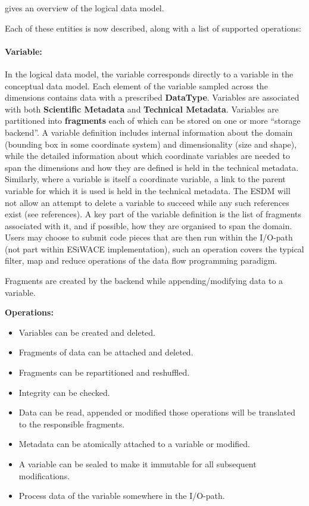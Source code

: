  gives an overview of the logical data model.



Each of these entities is now described, along with a list of supported operations:

\paragraph{Variable:} In the logical data model, the variable corresponds directly to a variable in the conceptual data model. Each element of the variable sampled across the dimensions contains data with a prescribed \textbf{DataType}.
Variables are associated with both \textbf{Scientific Metadata} and \textbf{Technical Metadata}. Variables are partitioned into \textbf{fragments} each of which can be stored on one or more ``storage backend''.
A variable definition includes internal information about the domain (bounding box in some coordinate system)  and dimensionality (size and shape), while the detailed information about which coordinate variables are needed to span the dimensions and how they are defined is held in the technical metadata.  Similarly, where a variable is itself a coordinate variable, a link to the parent variable for which it is used is held in the technical metadata.
The ESDM will not allow an attempt to delete a variable to succeed while any such references exist (see references).
A key part of the variable definition is the list of fragments associated with it, and if possible, how they are organised to span the domain.
Users may choose to submit code pieces that are then run within the I/O-path (not part within ESiWACE implementation), such an operation covers the typical filter, map and reduce operations of the data flow programming paradigm.

Fragments are created by the backend while appending/modifying data to a variable.

\textbf{Operations:}
\begin{itemize}
	\item Variables can be created and deleted.
	\item Fragments of data can be attached and deleted.
	\item Fragments can be repartitioned and reshuffled.
	\item Integrity can be checked.
	\item Data can be read, appended or modified those operations will be translated to the responsible fragments.
	\item Metadata can be atomically attached to a variable or modified.
	\item A variable can be sealed to make it immutable for all subsequent modifications.
	\item Process data of the variable somewhere in the I/O-path.
\end{itemize}

